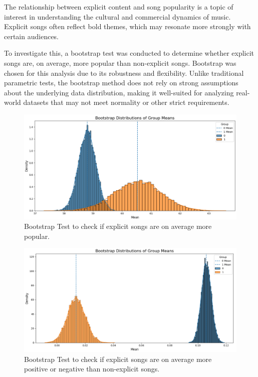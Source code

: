 The relationship between explicit content and song popularity is a topic of
interest in understanding the cultural and commercial dynamics of music.
Explicit songs often reflect bold themes, which may resonate more strongly with
certain audiences. 

To investigate this, a bootstrap test was conducted to determine whether
explicit songs are, on average, more popular than non-explicit songs. Bootstrap
was chosen for this analysis due to its robustness and flexibility. Unlike
traditional parametric tests, the bootstrap method does not rely on strong
assumptions about the underlying data distribution, making it well-suited for
analyzing real-world datasets that may not meet normality or other strict
requirements.


\begin{center}
\begin{figure}[H]
  \centering
  \includegraphics[width=5in]{img/explicitness_bootstrap.png}
  \caption{Bootstrap Test to check if explicit songs are on average more
  popular.}
  \label{Figure:fig_bh}
\end{figure}
\end{center}



\begin{center}
\begin{figure}[H]
  \centering
  \includegraphics[width=5in]{img/explicitness_bootstrap_2.png}
  \caption{Bootstrap Test to check if explicit songs are on average more
  positive or negative than non-explicit songs.}
  \label{Figure:fig_bh}
\end{figure}
\end{center}



